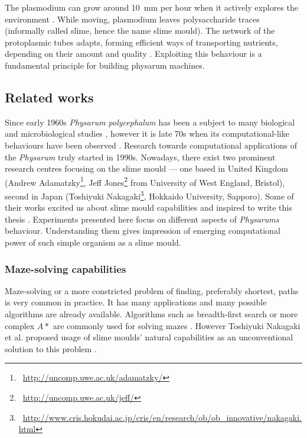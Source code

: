 \documentclass[english,a4paper,twoside]{ppfcmthesis}
\begin{document}
The plasmodium can grow around 10~mm per hour when it actively explores the environment \cite{coggin1996dynamic}. While moving, plasmodium leaves polysaccharide traces (informally called slime, hence the name slime mould). The network of the protoplasmic tubes adapts, forming efficient ways of transporting nutrients, depending on their amount and quality \cite{nakagaki2004obtaining}. Exploiting this behaviour is a fundamental principle for building physarum machines.


\subsection{Related works}

Since early 1960s \textit{Physarum polycephalum} has been a subject to many biological and microbiological studies \cite{guttes1964mitotic,daniel1962method}, however it is late 70s when its computational-like behaviours have been observed \cite{wohlfarth1979oscillatory}. Research towards computational applications of the \textit{Physarum} truly started in 1990s. Nowadays, there exist two prominent research centres focusing on the slime mould --- one based in United Kingdom (Andrew Adamatzky\footnote{~\url{http://uncomp.uwe.ac.uk/adamatzky/}}, Jeff Jones\footnote{~\url{http://uncomp.uwe.ac.uk/jeff/}} from University of West England, Bristol), second in Japan (Toshiyuki Nakagaki\footnote{~\url{http://www.cris.hokudai.ac.jp/cris/en/research/ob/ob\_innovative/nakagaki.html}}, Hokkaido University, Sapporo). Some of their works excited us about slime mould capabilities and inspired to write this thesis \cite{nakagaki2000intelligence,adamatzky2010physarum,jones2015pattern,adamatzky2007physarum}. Experiments presented here focus on different aspects of \textit{Physarums} behaviour. Understanding them gives impression of emerging computational power of such simple organism as a slime mould.


\subsubsection{Maze-solving capabilities}

Maze-solving or a more constricted problem of finding, preferably shortest, paths is very common in practice. It has many applications and many possible algorithms are already available. Algorithms such as breadth-first search or more complex $A*$ are commonly used for solving mazes \cite{zelkowitz1979principles}. However Toshiyuki Nakagaki et al. proposed usage of slime moulds' natural capabilities as an unconventional solution to this problem \cite{nakagaki2000intelligence}.
\end{document}
